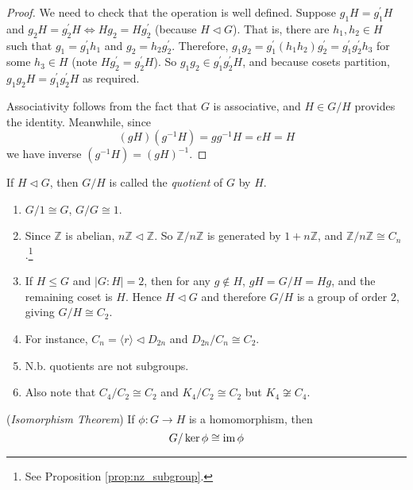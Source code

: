 \documentclass[10pt, a4paper, twoside]{report}
\begin{document}
\begin{proof}
    We need to check that the operation is well defined. Suppose \(g_1H=g_1^\prime H\) and \(g_2H=g_2^\prime H\Leftrightarrow Hg_2=Hg_2^\prime\) (because \(H\lhd G\)). That is, there are \(h_1,h_2\in H\) such that \(g_1=g_1^\prime h_1\) and \(g_2=h_2g_2^\prime\). Therefore, \(g_1g_2=g_1^\prime(h_1h_2)g_2^\prime=g_1^\prime g_2^\prime h_3\) for some \(h_3\in H\)  (note \(Hg_2^\prime=g_2^\prime H\)). So \(g_1g_2\in g_1^\prime g_2^\prime H\), and because cosets partition, \(g_1g_2H=g_1^\prime g_2^\prime H\) as required.

    Associativity follows from the fact that \(G\) is associative, and \(H\in G/H\) provides the identity. Meanwhile, since 
    \[(gH)(g^{-1}H)=gg^{-1}H=eH=H\]
    we have inverse \((g^{-1}H)=(gH)^{-1}\).
\end{proof}
\begin{definition}
    If \(H\lhd G\), then \(G/H\) is called the \emph{quotient} of \(G\) by \(H\).
\end{definition}
\begin{example} \item[] 
    \begin{enumerate}
        \item \(G/1\cong G\), \(G/G\cong 1\).
        \item Since \(\mathbb{Z}\) is abelian, \(n\mathbb{Z}\lhd\mathbb{Z}\). So \(\mathbb{Z}/n\mathbb{Z}\) is generated by \(1+n\mathbb{Z}\), and \(\mathbb{Z}/n\mathbb{Z}\cong C_n\).\footnote{See Proposition \ref{prop:nz_subgroup}.}
        \item If \(H\leq G\) and \(|G:H|=2\), then for any \(g\notin H\), \(gH=G/H=Hg\), and the remaining coset is \(H\). Hence \(H\lhd G\) and therefore \(G/H\) is a group of order \(2\), giving \(G/H\cong C_2\).
        \item For instance, \(C_n=\langle r\rangle\lhd D_{2n}\) and \(D_{2n}/C_n\cong C_2\).
        \item N.b. quotients are not subgroups.
        \item Also note that \(C_4/C_2\cong C_2\) and \(K_4/C_2\cong C_2\) but \(K_4\not\cong C_4\).
    \end{enumerate}
\end{example}
\begin{theorem}
    (\emph{Isomorphism Theorem}) If \(\phi:G\to H\) is a homomorphism, then
    \[G/\ker\phi\cong\operatorname{im}\phi\]
    \label{thm:isom}
\end{theorem}
\end{document}
